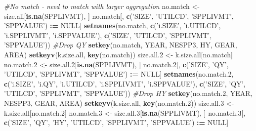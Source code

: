 \documentclass[]{article}
\newenvironment{Shaded}{\begin{snugshade}}{\end{snugshade}}
\newcommand{\KeywordTok}[1]{\textcolor[rgb]{0.13,0.29,0.53}{\textbf{#1}}}
\newcommand{\DecValTok}[1]{\textcolor[rgb]{0.00,0.00,0.81}{#1}}
\newcommand{\StringTok}[1]{\textcolor[rgb]{0.31,0.60,0.02}{#1}}
\newcommand{\CommentTok}[1]{\textcolor[rgb]{0.56,0.35,0.01}{\textit{#1}}}
\newcommand{\OtherTok}[1]{\textcolor[rgb]{0.56,0.35,0.01}{#1}}
\newcommand{\OperatorTok}[1]{\textcolor[rgb]{0.81,0.36,0.00}{\textbf{#1}}}
\newcommand{\ErrorTok}[1]{\textcolor[rgb]{0.64,0.00,0.00}{\textbf{#1}}}
\newcommand{\NormalTok}[1]{#1}
\begin{document}
\begin{Shaded}
\begin{Highlighting}[]
  \CommentTok{#No match - need to match with larger aggregation}
\NormalTok{  no.match  <-}\StringTok{ }\NormalTok{size.all[}\KeywordTok{is.na}\NormalTok{(SPPLIVMT), ]}
\NormalTok{  no.match[, }\KeywordTok{c}\NormalTok{(}\StringTok{'SIZE'}\NormalTok{, }\StringTok{'UTILCD'}\NormalTok{, }\StringTok{'SPPLIVMT'}\NormalTok{, }\StringTok{'SPPVALUE'}\NormalTok{) }\OperatorTok{:}\ErrorTok{=}\StringTok{ }\OtherTok{NULL}\NormalTok{]}
  \KeywordTok{setnames}\NormalTok{(no.match, }\KeywordTok{c}\NormalTok{(}\StringTok{'i.SIZE'}\NormalTok{, }\StringTok{'i.UTILCD'}\NormalTok{, }\StringTok{'i.SPPLIVMT'}\NormalTok{, }\StringTok{'i.SPPVALUE'}\NormalTok{), }
           \KeywordTok{c}\NormalTok{(}\StringTok{'SIZE'}\NormalTok{, }\StringTok{'UTILCD'}\NormalTok{, }\StringTok{'SPPLIVMT'}\NormalTok{, }\StringTok{'SPPVALUE'}\NormalTok{))}
  \CommentTok{#Drop QY}
  \KeywordTok{setkey}\NormalTok{(no.match, YEAR, NESPP3, HY, GEAR, AREA)}
  \KeywordTok{setkeyv}\NormalTok{(k.size.all, }\KeywordTok{key}\NormalTok{(no.match))}
\NormalTok{  size.all.}\DecValTok{2}\NormalTok{ <-}\StringTok{ }\NormalTok{k.size.all[no.match]}
\NormalTok{  no.match.}\DecValTok{2}\NormalTok{ <-}\StringTok{ }\NormalTok{size.all.}\DecValTok{2}\NormalTok{[}\KeywordTok{is.na}\NormalTok{(SPPLIVMT), ]}
\NormalTok{  no.match.}\DecValTok{2}\NormalTok{[, }\KeywordTok{c}\NormalTok{(}\StringTok{'SIZE'}\NormalTok{, }\StringTok{'QY'}\NormalTok{, }\StringTok{'UTILCD'}\NormalTok{, }\StringTok{'SPPLIVMT'}\NormalTok{, }\StringTok{'SPPVALUE'}\NormalTok{) }\OperatorTok{:}\ErrorTok{=}\StringTok{ }\OtherTok{NULL}\NormalTok{]}
  \KeywordTok{setnames}\NormalTok{(no.match.}\DecValTok{2}\NormalTok{, }\KeywordTok{c}\NormalTok{(}\StringTok{'i.SIZE'}\NormalTok{, }\StringTok{'i.QY'}\NormalTok{, }\StringTok{'i.UTILCD'}\NormalTok{, }\StringTok{'i.SPPLIVMT'}\NormalTok{, }\StringTok{'i.SPPVALUE'}\NormalTok{), }
           \KeywordTok{c}\NormalTok{(}\StringTok{'SIZE'}\NormalTok{, }\StringTok{'QY'}\NormalTok{, }\StringTok{'UTILCD'}\NormalTok{, }\StringTok{'SPPLIVMT'}\NormalTok{, }\StringTok{'SPPVALUE'}\NormalTok{))}
  \CommentTok{#Drop HY}
  \KeywordTok{setkey}\NormalTok{(no.match.}\DecValTok{2}\NormalTok{, YEAR, NESPP3, GEAR, AREA)}
  \KeywordTok{setkeyv}\NormalTok{(k.size.all, }\KeywordTok{key}\NormalTok{(no.match.}\DecValTok{2}\NormalTok{))}
\NormalTok{  size.all.}\DecValTok{3}\NormalTok{ <-}\StringTok{ }\NormalTok{k.size.all[no.match.}\DecValTok{2}\NormalTok{]}
\NormalTok{  no.match.}\DecValTok{3}\NormalTok{ <-}\StringTok{ }\NormalTok{size.all.}\DecValTok{3}\NormalTok{[}\KeywordTok{is.na}\NormalTok{(SPPLIVMT), ]}
\NormalTok{  no.match.}\DecValTok{3}\NormalTok{[, }\KeywordTok{c}\NormalTok{(}\StringTok{'SIZE'}\NormalTok{, }\StringTok{'QY'}\NormalTok{, }\StringTok{'HY'}\NormalTok{, }\StringTok{'UTILCD'}\NormalTok{, }\StringTok{'SPPLIVMT'}\NormalTok{, }\StringTok{'SPPVALUE'}\NormalTok{) }\OperatorTok{:}\ErrorTok{=}\StringTok{ }\OtherTok{NULL}\NormalTok{]}

\end{Highlighting}
\end{Shaded}
\end{document}

